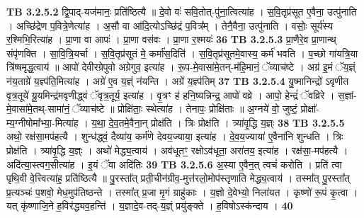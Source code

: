 \documentclass[17pt]{extarticle}
\begin{document}
{{{{{{{{{{{{{{{{{{{                  \newline
                                \textbf{ TB 3.2.5.2} \newline
                  द्वि॒पाद्-यज॑मानः॒ प्रति॑ष्ठित्यै ॥ दे॒वो वः॑ सवि॒तोत्-पु॑ना॒त्वित्या॑ह । स॒वि॒तृप्र॑सूत ए॒वैना॒ उत्पु॑नाति । अच्छि॑द्रेण प॒वित्रे॒णेत्या॑ह । अ॒सौ वा आ॑दि॒त्योऽच्छि॑द्रं प॒वित्र᳚म् । तेनै॒वैना॒ उत्पु॑नाति । वसोः॒ सूर्य॑स्य र॒श्मिभि॒रित्या॑ह । प्रा॒णा वा आपः॑ । प्रा॒णा वस॑वः । प्रा॒णा र॒श्मयः॑ \textbf{ 36} \newline
                  \newline
                                \textbf{ TB 3.2.5.3} \newline
                  प्रा॒णैरे॒व प्रा॒णान्थ् संपृ॑णक्ति । सा॒वि॒त्रि॒यर्चा । स॒वि॒तृप्र॑सूतं मे॒ कर्मा॑स॒दिति॑ । स॒वि॒तृप्र॑सूतमे॒वास्य॒ कर्म॑ भवति । प॒च्छो गा॑यत्रि॒या त्रि॑ष्षमृद्ध॒त्वाय॑ ॥ आपो॑ देवीरग्रेपुवो अग्रेगुव॒ इत्या॑ह । रू॒प-मे॒वासा॑मे॒तन्-म॑हि॒मानं॒ ॅव्याच॑ष्टे । अग्र॑ इ॒मं ॅय॒ज्ञ्ं न॑य॒ताग्रे॑ य॒ज्ञ्प॑ति॒मित्या॑ह । अग्रे॑ ए॒व य॒ज्ञ्ं न॑यन्ति । अग्रे॑ य॒ज्ञ्प॑तिम् \textbf{ 37} \newline
                  \newline
                                \textbf{ TB 3.2.5.4} \newline
                  यु॒ष्मानिन्द्रो॑ ऽवृणीत वृत्र॒तूये॑ यू॒यमिन्द्र॑मवृणीद्ध्वं ॅवृत्र॒तूर्य॒ इत्या॑ह । वृ॒त्रꣳ ह॑ हनि॒ष्यन्निन्द्र॒ आपो॑ वव्रे । आपो॒ हेन्द्रं॑ ॅवव्रिरे । स॒ज्ञां-मे॒वासा॑मे॒तथ्-सामा॑नं॒ ॅव्याच॑ष्टे ॥ प्रोक्षि॑ताः॒ स्थेत्या॑ह । तेनापः॒ प्रोक्षि॑ताः ॥ अ॒ग्नये॑ वो॒ जुष्टं॒ प्रोक्षा᳚-म्य॒ग्नीषोमा᳚भ्या॒-मित्या॑ह । य॒था॒ दे॒व॒तमे॒वैना॒न् प्रोक्ष॑ति । त्रिः प्रोक्ष॑ति । त्र्या॑वृ॒द्धि य॒ज्ञ्ः \textbf{ 38} \newline
                  \newline
                                \textbf{ TB 3.2.5.5} \newline
                  अथो॒ रक्ष॑सा॒मप॑हत्यै । शुन्ध॑द्ध्वं॒ दैव्या॑य॒ कर्म॑णे देवय॒ज्याया॒ इत्या॑ह । दे॒व॒य॒ज्याया॑ ए॒वैना॑नि शुन्धति । त्रिः प्रोक्ष॑ति । त्र्या॑वृ॒द्धि य॒ज्ञ्ः । अथो॑ मेद्ध्य॒त्वाय॑ । अव॑धूतꣳ॒॒ रक्षोऽव॑धूता॒ अरा॑तय॒ इत्या॑ह । रक्ष॑सा॒-मप॑हत्यै । अदि॑त्या॒स्त्वग॒सीत्या॑ह । इ॒यं ॅवा अदि॑तिः \textbf{ 39} \newline
                  \newline
                                \textbf{ TB 3.2.5.6} \newline
                  अ॒स्या ए॒वैन॒त् त्वचं॑ करोति । प्रति॑ त्वा पृथि॒वी वे॒त्त्वित्या॑ह॒ प्रति॑ष्ठित्यै ॥ पु॒रस्ता᳚त् प्रती॒चीन॑ग्रीव॒-मुत्त॑रलो॒मोप॑स्तृणाति मेद्ध्य॒त्वाय॑ । तस्मा᳚त् पु॒रस्ता᳚त् प्र॒त्यञ्चः॑ प॒शवो॒ मेध॒मुप॑तिष्ठन्ते । तस्मा᳚त् प्र॒जा मृ॒गं ग्राहु॑काः । य॒ज्ञो दे॒वेभ्यो॒ निला॑यत । कृष्णो॑ रू॒पं कृ॒त्वा । यत् कृ॑ष्णाजि॒ने ह॒विर॑द्ध्यव॒हन्ति॑ । य॒ज्ञादे॒व-तद्-य॒ज्ञ्ं प्रयु॑ङ्क्ते । ह॒विषोऽस्क॑न्दाय । \textbf{ 40} \newline
}}}}}}}}}}}}}}}}}}}
\end{document}
